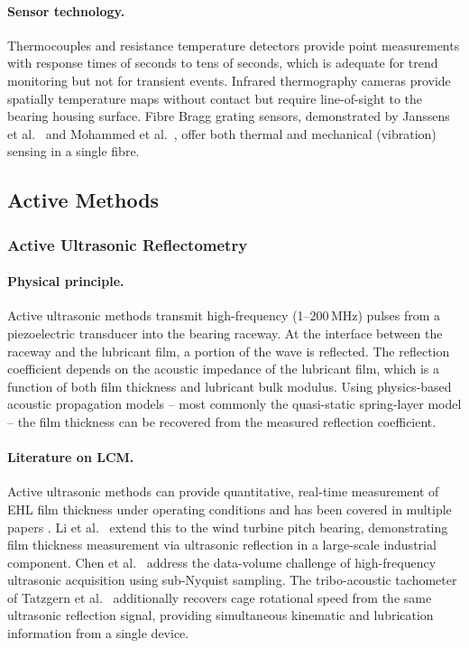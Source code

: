 \paragraph{Sensor technology.}
Thermocouples and resistance temperature detectors provide point measurements with response times of seconds to tens of seconds, which is adequate for trend monitoring but not for transient events. Infrared thermography cameras provide spatially temperature maps without contact but require line-of-sight to the bearing housing surface. Fibre Bragg grating sensors, demonstrated by Janssens et al.\ \cite{janssens_thermal_2015} and Mohammed et al.\ \cite{mohammed_electric_2021}, offer both thermal and mechanical (vibration) sensing in a single fibre.

\subsection{Active Methods}
\label{subsec:active}

\subsubsection{Active Ultrasonic Reflectometry}
\label{subsubsec:ultrasonic_active}

\paragraph{Physical principle.} Active ultrasonic methods transmit high-frequency (1--200\,MHz) pulses from a piezoelectric transducer into the bearing raceway. At the interface between the raceway and the lubricant film, a portion of the wave is reflected. The reflection coefficient depends on the acoustic impedance of the lubricant film, which is a function of both film thickness and lubricant bulk modulus. Using physics-based acoustic propagation models -- most commonly the quasi-static spring-layer model \cite{drinkwater_ultrasonic_2009} -- the film thickness can be recovered from the measured reflection coefficient.

\paragraph{Literature on LCM.} Active ultrasonic methods can provide quantitative, real-time measurement of EHL film thickness under operating conditions and has been covered in multiple papers \cite{dwyer-joyce_measurement_2003,zhang_ultrasonic_2015,chen_evaluation_2023}. Li et al.\ \cite{li_lubrication_2026} extend this to the wind turbine pitch bearing, demonstrating film thickness measurement via ultrasonic reflection in a large-scale industrial component. Chen et al.\ \cite{chen_sub-nyquist_2025} address the data-volume challenge of high-frequency ultrasonic acquisition using sub-Nyquist sampling. The tribo-acoustic tachometer of Tatzgern et al.\ \cite{tatzgern_tribo-acoustic_2025} additionally recovers cage rotational speed from the same ultrasonic reflection signal, providing simultaneous kinematic and lubrication information from a single device.

